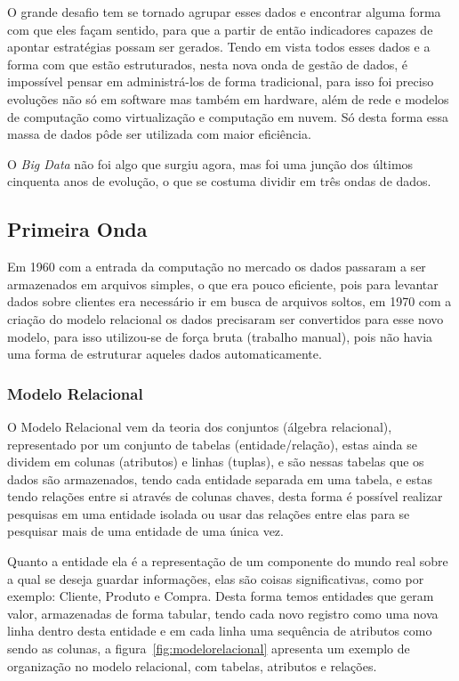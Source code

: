 O grande desafio tem se tornado agrupar esses dados e encontrar alguma forma com que eles façam sentido, para que a partir de então indicadores capazes de apontar estratégias possam ser gerados. Tendo em vista todos esses dados e a forma com que estão estruturados, nesta nova onda de gestão de dados, é impossível pensar em administrá-los de forma tradicional, para isso foi preciso evoluções não só em software mas também em hardware, além de rede e modelos de computação como virtualização e computação em nuvem. Só desta forma essa massa de dados pôde ser utilizada com maior eficiência.~\cite{leigos}

O \textit{Big Data} não foi algo que surgiu agora, mas foi uma junção dos últimos cinquenta anos de evolução, o que se costuma dividir em três ondas de dados.

\subsection{Primeira Onda}
\label{subsec:primeiraonda}
Em 1960 com a entrada da computação no mercado os dados passaram a ser armazenados em arquivos simples, o que era pouco eficiente, pois para levantar dados sobre clientes era necessário ir em busca de arquivos soltos, em 1970 com a criação do modelo relacional os dados precisaram ser convertidos para esse novo modelo, para isso utilizou-se de força bruta (trabalho manual), pois não havia uma forma de estruturar aqueles dados automaticamente.%

\subsubsection{Modelo Relacional}
\label{subsubsec:modelorelacional}
O Modelo Relacional vem da teoria dos conjuntos (álgebra relacional), representado por um conjunto de tabelas (entidade/relação), estas ainda se dividem em colunas (atributos) e linhas (tuplas), e são nessas tabelas que os dados são armazenados, tendo cada entidade separada em uma tabela, e estas tendo relações entre si através de colunas chaves, desta forma é possível realizar pesquisas em uma entidade isolada ou usar das relações entre elas para se pesquisar mais de uma entidade de uma única vez.

Quanto a entidade ela é a representação de um componente do mundo real sobre a qual se deseja guardar informações, elas são coisas significativas, como por exemplo: Cliente, Produto e Compra. Desta forma temos entidades que geram valor, armazenadas de forma tabular, tendo cada novo registro como uma nova linha dentro desta entidade e em cada linha uma sequência de atributos como sendo as colunas, a figura~\ref{fig:modelorelacional} apresenta um exemplo de organização no modelo relacional, com tabelas, atributos e relações.~\cite{relacional}

